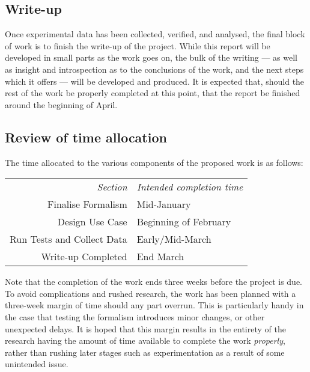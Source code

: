 \subsection{Write-up}
Once experimental data has been collected, verified, and analysed, the final block of work is to finish the write-up of the project. While this report will be developed in small parts as the work goes on, the bulk of the writing --- as well as insight and introspection as to the conclusions of the work, and the next steps which it offers --- will be developed and produced. It is expected that, should the rest of the work be properly completed at this point, that the report be finished around the beginning of April.


\subsection{Review of time allocation}
The time allocated to the various components of the proposed work is as follows:\\
\begin{tabular}{r|l}
    \emph{Section} & \emph{Intended completion time}\\
    Finalise Formalism & Mid-January\\
    Design Use Case & Beginning of February\\
    Run Tests and Collect Data & Early/Mid-March\\
    Write-up Completed & End March\\
\end{tabular}\par

Note that the completion of the work ends three weeks before the project is due. To avoid complications and rushed research, the work has been planned with a three-week margin of time should any part overrun. This is particularly handy in the case that testing the formalism introduces minor changes, or other unexpected delays. It is hoped that this margin results in the entirety of the research having the amount of time available to complete the work \emph{properly}, rather than rushing later stages such as experimentation as a result of some unintended issue.\par
